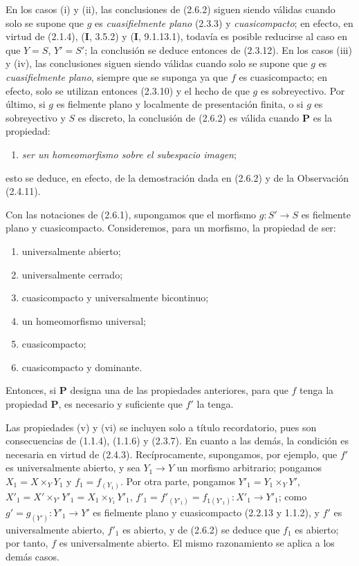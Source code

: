\begin{remark}[2.6.3]
\label{IV.2.6.3-fr}
En los casos (i) y (ii), las conclusiones de (2.6.2) siguen siendo válidas
cuando solo se supone que $g$ es \emph{cuasifielmente plano} (2.3.3) y \emph{cuasicompacto};
en efecto, en virtud de (2.1.4), (\textbf I, 3.5.2) y (\textbf I, 9.1.13.1), todavía es posible
reducirse al caso en que $Y=S$, $Y'=S'$; la conclusión se deduce entonces de
(2.3.12). En los casos (iii) y (iv), las conclusiones siguen siendo válidas
cuando solo se supone que $g$ es \emph{cuasifielmente plano}, siempre que se suponga
ya que $f$ es cuasicompacto; en efecto, solo se utilizan entonces (2.3.10) y el
hecho de que $g$ es sobreyectivo. Por último, si $g$ es fielmente plano y
localmente de presentación finita, o si $g$ es sobreyectivo y $S$ es discreto,
la conclusión de (2.6.2) es válida cuando $\boldsymbol{P}$ es la propiedad:
\begin{enumerate}
\item[(iii \emph{bis})] \emph{ser un homeomorfismo sobre el subespacio imagen};
\end{enumerate}
esto se deduce, en efecto, de la demostración dada en (2.6.2) y de la
Observación (2.4.11).
\end{remark}

\begin{corollary}[2.6.4]
\label{IV.2.6.4-fr}
Con las notaciones de \textup{(2.6.1)}, supongamos que el morfismo $g:S'\to S$ es
fielmente plano y cuasicompacto. Consideremos, para un morfismo, la propiedad
de ser:
\begin{enumerate}
\item[\textup{(i)}] universalmente abierto;
\item[\textup{(ii)}] universalmente cerrado;
\item[\textup{(iii)}] cuasicompacto y universalmente bicontinuo;
\item[\textup{(iv)}] un homeomorfismo universal;
\item[\textup{(v)}] cuasicompacto;
\item[\textup{(vi)}] cuasicompacto y dominante.
\end{enumerate}
Entonces, si $\boldsymbol{P}$ designa una de las propiedades anteriores, para que $f$ tenga
la propiedad $\boldsymbol{P}$, es necesario y suficiente que $f'$ la tenga.
\end{corollary}

Las propiedades (v) y (vi) se incluyen solo a título recordatorio, pues son
consecuencias de (1.1.4), (1.1.6) y (2.3.7). En cuanto a las demás, la condición
es necesaria en virtud de (2.4.3). Recíprocamente, supongamos, por ejemplo, que
$f'$ es universalmente abierto, y sea $Y_1\to Y$ un morfismo arbitrario;
pongamos $X_1=X\times_Y Y_1$ y $f_1=f_{(Y_1)}$. Por otra parte, pongamos $Y'_1=Y_1\times_Y Y'$, $X'_1=X'\times_{Y'}Y'_1=X_1\times_{Y_1}Y'_1$, $f'_1=f'_{(Y'_1)}=f_{1(Y'_1)}:X'_1\to Y'_1$;
como $g'=g_{(Y')}:Y'_1\to Y'$ es fielmente plano y cuasicompacto
(2.2.13 y 1.1.2), y $f'$ es universalmente abierto, $f'_1$ es abierto, y de
(2.6.2) se deduce que $f_1$ es abierto; por tanto, $f$ es universalmente
abierto. El mismo razonamiento se aplica a los demás casos.

